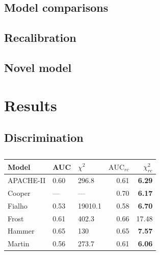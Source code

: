 \documentclass[onecolumn]{article}
\begin{document}
\subsection{Model comparisons}


\subsection{Recalibration}


\subsection{Novel model}



\section{Results}


\subsection{Discrimination}


\begin{table}[hb]
\centering
	\renewcommand{\arraystretch}{1.4}
		\caption{}%
		\begin{tabular}{lllrr}
		\hline
		Model & AUC & $ \chi^{2} $ & $ \mathrm{AUC}_{rc} $ & $ \chi^{2}_{rc} $\\
		\hline
		APACHE-II & 0.60 & 296.8 & 0.61 & \textbf{6.29}\\
		Cooper & --- & --- & 0.70 & \textbf{6.17}\\
		Fialho & 0.53 & 19010.1 & 0.58 & \textbf{6.70}\\
		Frost & 0.61 & 402.3 & 0.66 & 17.48\\
		Hammer & 0.65 & 130 & 0.65 & \textbf{7.57}\\
		Martin & 0.56 & 273.7 & 0.61 & \textbf{6.06}\\
		\hline
		\end{tabular}
	\label{ModelComparisonTable}
\end{table}
\end{document}
